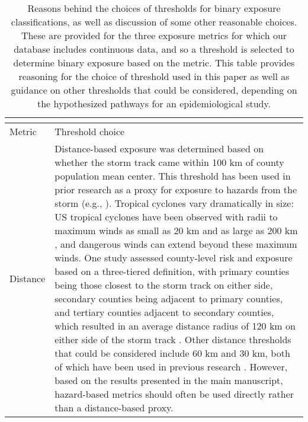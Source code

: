 \begin{longtable}{lp{40em}}
\caption{Reasons behind the choices of thresholds for binary exposure classifications, as well as discussion of some other reasonable choices. These are provided for the three exposure metrics for which our database includes continuous data, and so a threshold is selected to determine binary exposure based on the metric. This table provides reasoning for the choice of threshold used in this paper as well as guidance on other thresholds that could be considered, depending on the hypothesized pathways for an epidemiological study.} \\
\label{tab:thresholds} \\
\hline
Metric & Threshold choice\\
\hline
Distance & Distance-based exposure was determined based on whether the storm track came within 100 km of county population mean center. This threshold has been used in prior research as a proxy for exposure to hazards from the storm (e.g., \cite{grabich2015measuring}). Tropical cyclones vary dramatically in size: US tropical cyclones have been observed with radii to maximum winds as small as 20 km and as large as 200 km \parencite{mallin2006, quiring2011variations}, and dangerous winds can extend beyond these maximum winds. One study assessed county-level risk and exposure based on a three-tiered definition, with primary counties being those closest to the storm track on either side, secondary counties being adjacent to primary counties, and tertiary counties adjacent to secondary counties, which resulted in an average distance radius of 120 km on either side of the storm track \parencite{czajkowski2011}. Other distance thresholds that could be considered include 60 km and 30 km, both of which have been used in previous research \parencite{grabich2015measuring, grabich2015, currie2013}. However, based on the results presented in the main manuscript, hazard-based metrics should often be used directly rather than a distance-based proxy.\\

\end{longtable}
